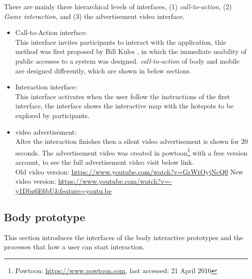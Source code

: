 There are mainly three hierarchical levels of interfaces, (1) \emph{call-to-action}, (2) \emph{Game interaction}, and (3) the advertisement video interface.

\begin{itemize}
\item Call-to-Action interface: \\
This interface invites participants to interact with the application, this method was first proposed by Bill Kules \cite{call-to-action}, in which the immediate usability of public accesses to a system was designed. \emph{call-to-action} of body and mobile are designed differently, which are shown in below sections. 

\item Interaction interface: \\
This interface activates when the user follow the instructions of the first interface, the interface shows the interactive map with the hotspots to be explored by participants.
\item video advertisement: \\
After the interaction finishes then a silent video advertisement is shown for 20 seconds. 
The advertisement video was created in powtoon\footnote{Powtoon: \url{https://www.powtoon.com}, last accessed: 21 April 2016} with a free version account, to see the full advertisement video visit below link.\\ 
Old video version: \url{https://www.youtube.com/watch?v=GrWtOyjNcQ0}
New video version: \url{https://www.youtube.com/watch?v=-y1Dbz6E6bU&feature=youtu.be}
\end{itemize}


\newpage
\subsection{Body prototype}
This section introduces the interfaces of the body interactive prototypes and the processes that how a user can start interaction. \\



